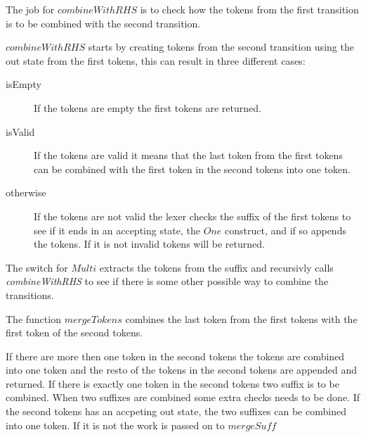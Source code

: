 The job for $combineWithRHS$ is to check how the tokens from the first
transition is to be combined with the second transition.

$combineWithRHS$ starts by creating tokens from the second transition using the
out state from the first tokens, this can result in three different cases:
\begin{description}
\item[isEmpty]If the tokens are empty the first tokens are returned.
\item[isValid]If the tokens are valid it means that the last token from the
first tokens can be combined with the first token in the second tokens into one
token.
\item[otherwise]If the tokens are not valid the lexer checks the suffix of the
first tokens to see if it ends in an accepting state, the $One$ construct, and
if so appends the tokens. If it is not invalid tokens will be returned.
\end{description}
The switch for $Multi$ extracts the tokens from the suffix and recursivly calls
\emph{combineWithRHS} to see if there is some other possible way to combine the
transitions.

The function $mergeTokens$ combines the last token from the first tokens with
the first token of the second tokens.

If there are more then one token in the second tokens the tokens are combined
into one token and the resto of the tokens in the second tokens are appended and
returned. If there is exactly one token in the second tokens two suffix is to be
combined. When two suffixes are combined some extra checks needs to be done.
If the second tokens has an accpeting out state, the two suffixes can be
combined into one token. If it is not the work is passed on to $mergeSuff$

